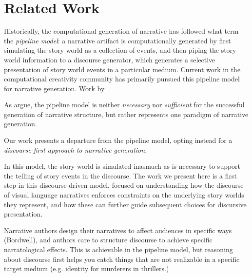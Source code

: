 \section{Related Work}


Historically, the computational generation of narrative has followed what
 term the \emph{pipeline model}: a narrative
artifact is computationally generated by first simulating the story world
as a collection of events, and then piping the story world information to a
discourse generator, which generates a selective presentation of story
world events in a particular medium. Current work in the computational
creativity community has primarily pursued this pipeline model for
narrative generation. Work by 

As \citeauthor{ronfard2014story} argue, the pipeline model is neither
\emph{necessary} nor \emph{sufficient} for the successful generation of
narrative structure, but rather represents one paradigm of narrative
generation.  


Our work presents a departure from the pipeline model, opting instead for a
\emph{discourse-first approach to narrative generation}. 



In this model, the
story world is simulated inasmuch as is necessary to support the telling of
story events in the discourse. The work we present here is a first step in
this discourse-driven model, focused on understanding how the discourse of
visual language narratives enforces constraints on the underlying story
worlds they represent, and how these can further guide subsequent choices
for discursive presentation.

Narrative authors design their narratives to affect audiences in specific
ways (Bordwell), and authors care to structure discourse to achieve
specific narratological effects.  This is achievable in the pipeline model,
but reasoning about discourse first helps you catch things that are not
realizable in a specific target medium (e.g. identity for murderers in
thrillers.)






